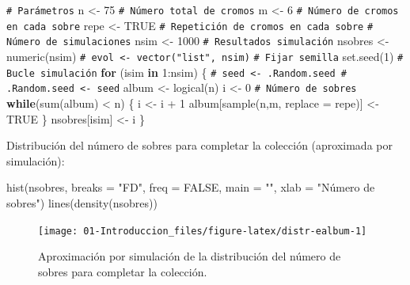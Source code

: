 \documentclass[
]{book}
\newenvironment{Shaded}{\begin{snugshade}}{\end{snugshade}}
\newcommand{\AttributeTok}[1]{\textcolor[rgb]{0.77,0.63,0.00}{#1}}
\newcommand{\CommentTok}[1]{\textcolor[rgb]{0.56,0.35,0.01}{\textit{#1}}}
\newcommand{\ConstantTok}[1]{\textcolor[rgb]{0.00,0.00,0.00}{#1}}
\newcommand{\ControlFlowTok}[1]{\textcolor[rgb]{0.13,0.29,0.53}{\textbf{#1}}}
\newcommand{\DecValTok}[1]{\textcolor[rgb]{0.00,0.00,0.81}{#1}}
\newcommand{\FunctionTok}[1]{\textcolor[rgb]{0.00,0.00,0.00}{#1}}
\newcommand{\NormalTok}[1]{#1}
\newcommand{\OtherTok}[1]{\textcolor[rgb]{0.56,0.35,0.01}{#1}}
\newcommand{\SpecialCharTok}[1]{\textcolor[rgb]{0.00,0.00,0.00}{#1}}
\newcommand{\StringTok}[1]{\textcolor[rgb]{0.31,0.60,0.02}{#1}}
\theoremstyle{break}
\theoremstyle{nonumberplain}
\renewcommand{\CommentTok}[1]{\textcolor[rgb]{0.41,0.41,0.41}{\texttt{#1}}}
\begin{document}
\begin{Shaded}
\begin{Highlighting}[]
\CommentTok{\# Parámetros}
\NormalTok{n }\OtherTok{\textless{}{-}} \DecValTok{75} \CommentTok{\# Número total de cromos}
\NormalTok{m }\OtherTok{\textless{}{-}} \DecValTok{6}  \CommentTok{\# Número de cromos en cada sobre}
\NormalTok{repe }\OtherTok{\textless{}{-}} \ConstantTok{TRUE} \CommentTok{\# Repetición de cromos en cada sobre}
\CommentTok{\# Número de simulaciones}
\NormalTok{nsim }\OtherTok{\textless{}{-}} \DecValTok{1000}
\CommentTok{\# Resultados simulación}
\NormalTok{nsobres }\OtherTok{\textless{}{-}} \FunctionTok{numeric}\NormalTok{(nsim)}
\CommentTok{\# evol \textless{}{-} vector("list", nsim)}
\CommentTok{\# Fijar semilla}
\FunctionTok{set.seed}\NormalTok{(}\DecValTok{1}\NormalTok{)}
\CommentTok{\# Bucle simulación}
\ControlFlowTok{for}\NormalTok{ (isim }\ControlFlowTok{in} \DecValTok{1}\SpecialCharTok{:}\NormalTok{nsim) \{}
  \CommentTok{\# seed \textless{}{-} .Random.seed    \# .Random.seed \textless{}{-} seed}
\NormalTok{  album }\OtherTok{\textless{}{-}} \FunctionTok{logical}\NormalTok{(n)}
\NormalTok{  i }\OtherTok{\textless{}{-}} \DecValTok{0} \CommentTok{\# Número de sobres}
  \ControlFlowTok{while}\NormalTok{(}\FunctionTok{sum}\NormalTok{(album) }\SpecialCharTok{\textless{}}\NormalTok{ n) \{}
\NormalTok{    i }\OtherTok{\textless{}{-}}\NormalTok{ i }\SpecialCharTok{+} \DecValTok{1}
\NormalTok{    album[}\FunctionTok{sample}\NormalTok{(n,m, }\AttributeTok{replace =}\NormalTok{ repe)] }\OtherTok{\textless{}{-}} \ConstantTok{TRUE}
\NormalTok{  \}}
\NormalTok{  nsobres[isim] }\OtherTok{\textless{}{-}}\NormalTok{ i}
\NormalTok{\}}
\end{Highlighting}
\end{Shaded}

Distribución del número de sobres para completar la colección
(aproximada por simulación):

\begin{Shaded}
\begin{Highlighting}[]
\FunctionTok{hist}\NormalTok{(nsobres, }\AttributeTok{breaks =} \StringTok{"FD"}\NormalTok{, }\AttributeTok{freq =} \ConstantTok{FALSE}\NormalTok{,}
     \AttributeTok{main =} \StringTok{""}\NormalTok{, }\AttributeTok{xlab =} \StringTok{"Número de sobres"}\NormalTok{)}
\FunctionTok{lines}\NormalTok{(}\FunctionTok{density}\NormalTok{(nsobres))}
\end{Highlighting}
\end{Shaded}

\begin{figure}[!htb]

{\centering \texttt{[image: 01-Introduccion\_files/figure-latex/distr-ealbum-1]} 

}

\caption{Aproximación por simulación de la distribución del número de sobres para completar la colección.}\label{fig:distr-ealbum}
\end{figure}
\end{document}
